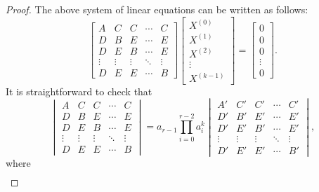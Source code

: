 \documentclass[10pt,a4paper]{amsart}
\begin{document}
\begin{proof}
   The above system of linear equations can be written as follows:
   {\small \begin{equation}
       \begin{bmatrix}
           A&C&C&\cdots&C\\
           D&B&E&\cdots&E\\
           D&E&B&\cdots&E\\
           \vdots&\vdots&\vdots&\ddots&\vdots\\
           D&E&E&\cdots&B
       \end{bmatrix}\begin{bmatrix}
           X^{(0)}\\
           X^{(1)}\\
           X^{(2)}\\
           \vdots\\
            X^{(k-1)}
       \end{bmatrix}=\begin{bmatrix}
           0\\
           0\\
           0\\
           \vdots\\
            0
       \end{bmatrix}.
   \end{equation}}
	It is straightforward to check that 
   {\small \begin{equation}\label{deteq}
        \begin{vmatrix}
           A&C&C&\cdots&C\\
           D&B&E&\cdots&E\\
           D&E&B&\cdots&E\\
           \vdots&\vdots&\vdots&\ddots&\vdots\\
           D&E&E&\cdots&B 
        \end{vmatrix}= a_{r-1}\prod_{i=0}^{r-2}a_{i}^{k}\begin{vmatrix}
           A'&C'&C'&\cdots&C'\\
           D'&B'&E'&\cdots&E'\\
           D'&E'&B'&\cdots&E'\\
           \vdots&\vdots&\vdots&\ddots&\vdots\\
           D'&E'&E'&\cdots&B' 
        \end{vmatrix},
    \end{equation}}
    where
    \vspace{-0.25cm}
    \begin{align*}

\end{align*}
\end{proof}
\end{document}
